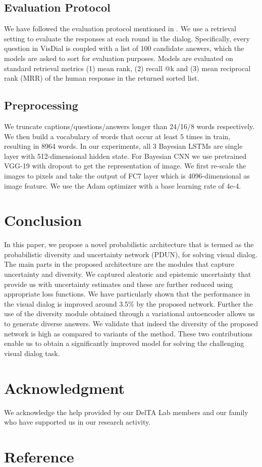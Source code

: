 \documentclass[review]{elsarticle}
\begin{document}
\subsection{Evaluation Protocol}
We have followed the evaluation protocol mentioned in \cite{Das_CVPR2017}. We use a retrieval setting to evaluate the responses at each round in the dialog. Specifically, every question in VisDial is coupled with a list of 100 candidate answers, which the models are asked to sort for evaluation purposes. Models are evaluated on standard retrieval metrics (1) mean rank, (2) recall @k and (3) mean reciprocal rank (MRR) of the human response in the returned sorted list.

\subsection{Preprocessing}
We truncate captions/questions/answers longer than 24/16/8 words respectively. We then build a vocabulary of words that occur at least 5 times in train, resulting in 8964 words. In our experiments, all 3 Bayesian  LSTMs are single layer with 512-dimensional hidden state. For Bayesian CNN we use pretrained VGG-19 \cite{Simonyan_arXiv2014} with dropout to get the representation of image. We first re-scale the images to  pixels and take the output of FC7 layer which is 4096-dimensional as image feature. We use the Adam optimizer with a base learning rate of 4e-4. 
















\section{Conclusion}
In this paper, we propose a novel probabilistic architecture that is termed as the probabilistic diversity and uncertainty network (PDUN), for solving visual dialog. The main parts in the proposed architecture are the modules that capture uncertainty and diversity. We captured aleatoric and epistemic uncertainty that provide us with uncertainty estimates and these are further reduced using appropriate loss functions.  We have particularly shown that the performance in the visual dialog is improved around 3.5\% by the proposed network. Further the use of the diversity module obtained through a variational autoencoder allows us to generate diverse answers. We validate that indeed the diversity of the proposed network is high as compared to variants of the method. These two contributions enable us to obtain a significantly improved model for solving the challenging visual dialog task.



\section{Acknowledgment}
We acknowledge the help provided by our DelTA Lab members and our family who have supported us in our research activity.
\section{Reference}


\end{document}
